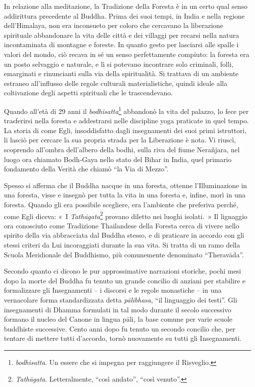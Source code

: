 In relazione alla meditazione, la Tradizione della Foresta è in un certo
qual senso addirittura precedente al Buddha. Prima dei suoi tempi, in
India e nella regione dell'Himalaya, non era inconsueto per coloro che
cercavano la liberazione spirituale abbandonare la vita delle città e
dei villaggi per recarsi nella natura incontaminata di montagne e
foreste. In quanto gesto per lasciarsi alle spalle i valori del mondo,
ciò recava in sé un senso perfettamente compiuto: la foresta era un
posto selvaggio e naturale, e lì si potevano incontrare solo criminali,
folli, emarginati e rinuncianti sulla via della spiritualità. Si
trattava di un ambiente estraneo all'influsso delle regole culturali
materialistiche, quindi ideale alla coltivazione degli aspetti
spirituali che le trascendevano.

Quando all'età di 29 anni il \emph{bodhisatta}\footnote{\emph{bodhisatta}.
  Un essere che si impegna per raggiungere il Risveglio.} abbandonò la
vita del palazzo, lo fece per trasferirsi nella foresta e addestrarsi
nelle discipline yoga praticate in quel tempo. La storia di come Egli,
insoddisfatto dagli insegnamenti dei suoi primi istruttori, li lasciò
per cercare la sua propria strada per la Liberazione è nota. Vi riuscì,
scoprendo all'ombra dell'albero della bodhi, sulla riva del fiume
Nerañjara, nel luogo ora chiamato Bodh-Gaya nello stato del Bihar in
India, quel primario fondamento della Verità che chiamò ``la Via di
Mezzo''.

Spesso si afferma che il Buddha nacque in una foresta, ottenne
l'Illuminazione in una foresta, visse e insegnò per tutta la vita in una
foresta e, infine, morì in una foresta. Quando gli era possibile
scegliere, era l'ambiente che preferiva perché, come Egli diceva: «~I
\emph{Tathāgata}\footnote{\emph{Tathāgata}. Letteralmente, ``così
  andato'', ``così venuto''.} provano diletto nei luoghi isolati.~» Il
lignaggio ora conosciuto come Tradizione Thailandese della Foresta cerca
di vivere nello spirito della via abbracciata dal Buddha stesso, e di
praticare in accordo con gli stessi criteri da Lui incoraggiati durante
la sua vita. Si tratta di un ramo della Scuola Meridionale del
Buddhismo, più comunemente denominato ``Theravāda''.

Secondo quanto ci dicono le pur approssimative narrazioni storiche,
pochi mesi dopo la morte del Buddha fu tenuto un grande concilio di
anziani per stabilire e formalizzare gli Insegnamenti -- i discorsi e le
regole monastiche -- in una vernacolare forma standardizzata detta
\emph{pālibhasa}, ``il linguaggio dei testi''. Gli insegnamenti di
Dhamma formulati in tal modo durante il secolo successivo formano il
nucleo del Canone in lingua pāli, la base comune per varie scuole
buddhiste successive. Cento anni dopo fu tenuto un secondo concilio che,
per tentare di mettere tutti d'accordo, tornò nuovamente su tutti gli
Insegnamenti.

